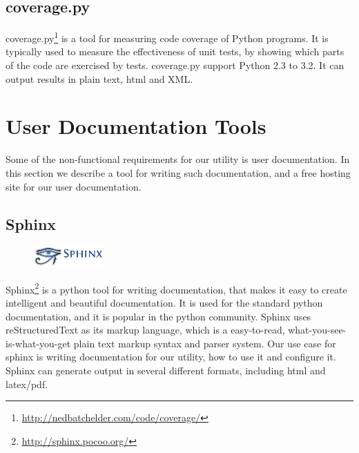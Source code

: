 \subsection{coverage.py}
coverage.py\footnote{\url{http://nedbatchelder.com/code/coverage/}} is a tool
for measuring code coverage of Python programs. It is typically used to measure
the effectiveness of unit tests, by showing which parts of the code are
exercised by tests. coverage.py support Python 2.3 to 3.2. It can output
results in plain text, html and XML.


\section{User Documentation Tools}
\label{sec:pre:docs}
Some of the non-functional requirements for our utility is user documentation.
In this section we describe a tool for writing such documentation, and a free
hosting site for our user documentation.

\subsection{Sphinx}
\begin{figure}
	\vspace{-20pt}
	\includegraphics[width=2.7cm]{./planning/img/sphinx_logo}
	\vspace{-20pt}
\end{figure}
Sphinx\footnote{\url{http://sphinx.pocoo.org/}} is a python tool for writing
documentation, that makes it easy to create intelligent and beautiful
documentation. It is used for the standard python documentation, and it is
popular in the python community. Sphinx uses reStructuredText as its markup
language, which is a easy-to-read, what-you-see-is-what-you-get plain text
markup syntax and parser system. Our use case for sphinx is writing
documentation for our utility, how to use it and configure it. Sphinx can
generate output in several different formats, including html and latex/pdf.

